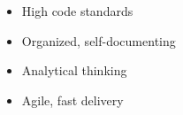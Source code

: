 %
%
%

\vspace{1em}
\begin{itemize}
    \item High code standards
    \item Organized, self-documenting
    \item Analytical thinking
    \item Agile, fast delivery
\end{itemize}
